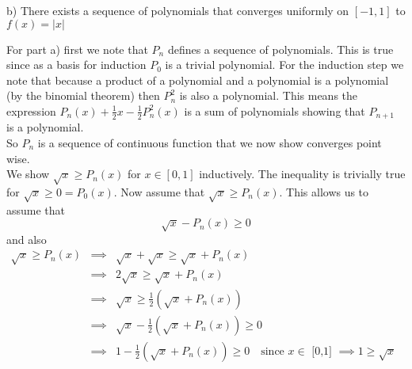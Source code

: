 \documentclass[11pt,reqno]{article}
\begin{document}
b) There exists a sequence of polynomials that converges uniformly on $[-1,1]$ to $f(x) = |x|$

For part a) first we note that $P_n$ defines a sequence of polynomials. This is true since as a basis for induction $P_0$ is a trivial polynomial. For the induction step we note that because a product of a polynomial and a polynomial is a polynomial (by the binomial theorem) then $P_n^2$ is also a polynomial. This means the expression $P_n(x) + \frac{1}{2}x-\frac{1}{2}P_n^2(x)$ is a sum of polynomials showing that $P_{n+1}$ is a polynomial.\\
\indent So $P_n$ is a sequence of continuous function that we now show converges point wise.\\
\indent We show $\sqrt{x} \ge P_n(x)$ for $ x \in [0,1]$ inductively. The inequality is trivially true for $\sqrt{x} \ge 0 = P_0(x)$. Now assume that $\sqrt{x} \ge P_n(x)$. This allows us to assume that
\begin{equation}
\sqrt{x} - P_n(x) \ge 0 \label{eqn:firstpolyineq}
\end{equation}
and also
\begin{eqnarray}
\sqrt{x} \ge P_n(x) &\implies& \sqrt{x} + \sqrt{x} \ge \sqrt{x} + P_n(x) \nonumber \\
			    &\implies& 2 \sqrt{x} \ge \sqrt{x} + P_n(x) \nonumber \\
			    &\implies& \sqrt{x} \ge \frac{1}{2}( \sqrt{x} + P_n(x) ) \nonumber \\
			    &\implies& \sqrt{x} - \frac{1}{2}( \sqrt{x} + P_n(x) ) \ge 0 \nonumber\\
			    &\implies& 1 - \frac{1}{2}( \sqrt{x} + P_n(x) ) \ge 0 \quad \text{since $x \in$ [0,1] $\implies 1 \ge \sqrt{x}$ } \label{eqn:secondpolyineq}
\end{eqnarray}
\end{document}
